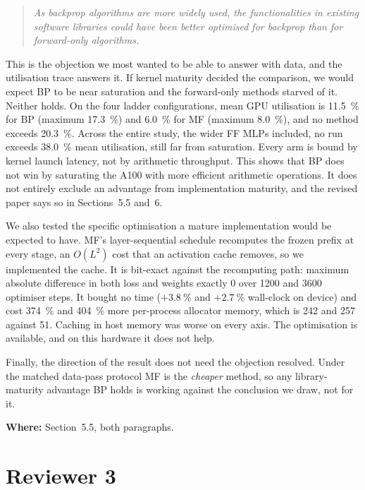 \documentclass[11pt,a4paper]{article}
\newcommand{\FF}{FF}
\newcommand{\MF}{MF}
\newcommand{\BP}{BP}
\newenvironment{comment}%
  {\begin{quote}\itshape\small}%
  {\end{quote}}
\newcommand{\where}[1]{\par\smallskip\noindent\textbf{Where:} #1\par}
\begin{document}
\begin{comment}
As backprop algorithms are more widely used, the functionalities in existing
software libraries could have been better optimised for backprop than for
forward-only algorithms.
\end{comment}

\noindent
This is the objection we most wanted to be able to answer with data, and the
utilisation trace answers it. If kernel maturity decided the comparison, we
would expect \BP{} to be near saturation and the forward-only methods starved
of it. Neither holds. On the four ladder configurations, mean GPU utilisation
is \SI{11.5}{\percent} for \BP{} (maximum \SI{17.3}{\percent}) and
\SI{6.0}{\percent} for \MF{} (maximum \SI{8.0}{\percent}), and no method
exceeds \SI{20.3}{\percent}. Across the entire study, the wider \FF{} MLPs
included, no run exceeds \SI{38.0}{\percent} mean utilisation, still far
from saturation. Every arm is bound by kernel launch latency, not by
arithmetic throughput. This shows that \BP{} does not win by saturating the
A100 with more efficient arithmetic operations. It does not entirely exclude
an advantage from implementation maturity, and the revised paper says so in
Sections~5.5 and~6.

We also tested the specific optimisation a mature implementation would be
expected to have. \MF{}'s layer-sequential schedule recomputes the frozen
prefix at every stage, an $O(L^2)$ cost that an activation cache removes, so
we implemented the cache. It is bit-exact against the recomputing path:
maximum absolute difference in both loss and weights exactly \num{0} over
\num{1200} and \num{3600} optimiser steps. It bought no time
($+\SI{3.8}{\percent}$ and $+\SI{2.7}{\percent}$ wall-clock on device) and
cost \SI{374}{\percent} and \SI{404}{\percent} more per-process allocator memory,
which is \SI{242}{\mebibyte} and \SI{257}{\mebibyte} against
\SI{51}{\mebibyte}. Caching in host memory was worse on every axis. The
optimisation is available, and on this hardware it does not help.

Finally, the direction of the result does not need the objection resolved.
Under the matched data-pass protocol \MF{} is the \emph{cheaper} method, so any
library-maturity advantage \BP{} holds is working against the conclusion we
draw, not for it.

\where{Section~5.5, both paragraphs.}

\section*{Reviewer 3}
\end{document}
